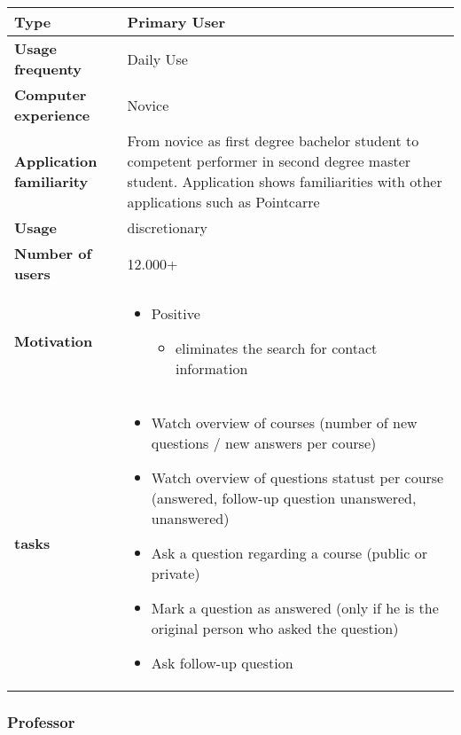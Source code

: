 \documentclass[10pt]{report}
\begin{document}
\begin{tabular}{ | l | p{10cm} |}
\hline
\textbf{Type} & Primary User \\ \hline
\textbf{Usage frequenty} & Daily Use \\ \hline
\textbf{Computer experience} & Novice \\ \hline
\textbf{Application familiarity} & From novice as first degree bachelor student to competent performer in second degree master student. Application shows familiarities with other applications such as Pointcarre\\ \hline
\textbf{Usage} & discretionary\\ \hline
\textbf{Number of users} & 12.000+\\ \hline
\textbf{Motivation} & 
	\begin{itemize}
		\item Positive 
		\begin{itemize}
			\item eliminates the search for contact information
		\end{itemize}
	\end{itemize} \\ \hline
\textbf{tasks} & 
	\begin{itemize}
		\item Watch overview of courses (number of new questions / new answers per course)
		\item Watch overview of questions statust per course (answered, follow-up question unanswered, unanswered)
		\item Ask a question regarding a course (public or private)
		\item Mark a question as answered (only if he is the original person who asked the question)
		\item Ask follow-up question
	\end{itemize} \\ \hline
\end{tabular}

\subsubsection{Professor}
\end{document}
